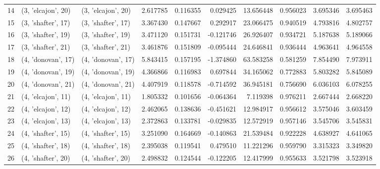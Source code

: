 \begin{tabular}{lllrrrrrrr}
14 &  (3, 'elcajon', 20) &  (3, 'elcajon', 20) &  2.617785 &  0.116355 &  0.029425 &  13.656448 &  0.956023 &  3.695346 &  3.695463 \\
15 &  (3, 'shafter', 17) &  (3, 'shafter', 17) &  3.367430 &  0.147667 &  0.292917 &  23.066475 &  0.940519 &  4.793816 &  4.802757 \\
16 &  (3, 'shafter', 19) &  (3, 'shafter', 19) &  3.471120 &  0.151731 & -0.121746 &  26.926407 &  0.934721 &  5.187638 &  5.189066 \\
17 &  (3, 'shafter', 21) &  (3, 'shafter', 21) &  3.461876 &  0.151809 & -0.095444 &  24.646841 &  0.936444 &  4.963641 &  4.964558 \\
18 &  (4, 'donovan', 17) &  (4, 'donovan', 17) &  5.843415 &  0.157195 & -1.374860 &  63.583258 &  0.581259 &  7.854490 &  7.973911 \\
19 &  (4, 'donovan', 19) &  (4, 'donovan', 19) &  4.366866 &  0.116983 &  0.697844 &  34.165062 &  0.772883 &  5.803282 &  5.845089 \\
20 &  (4, 'donovan', 21) &  (4, 'donovan', 21) &  4.407919 &  0.118578 & -0.714592 &  36.945181 &  0.756690 &  6.036103 &  6.078255 \\
21 &  (4, 'elcajon', 11) &  (4, 'elcajon', 11) &  1.805332 &  0.101656 & -0.064364 &   7.119398 &  0.976211 &  2.667444 &  2.668220 \\
22 &  (4, 'elcajon', 12) &  (4, 'elcajon', 12) &  2.462065 &  0.138636 & -0.451621 &  12.984917 &  0.956612 &  3.575046 &  3.603459 \\
23 &  (4, 'elcajon', 13) &  (4, 'elcajon', 13) &  2.372863 &  0.133781 & -0.029835 &  12.572919 &  0.957146 &  3.545706 &  3.545831 \\
24 &  (4, 'shafter', 15) &  (4, 'shafter', 15) &  3.251090 &  0.164669 & -0.140863 &  21.539484 &  0.922228 &  4.638927 &  4.641065 \\
25 &  (4, 'shafter', 18) &  (4, 'shafter', 18) &  2.395038 &  0.119541 &  0.479510 &  11.221296 &  0.959790 &  3.315323 &  3.349820 \\
26 &  (4, 'shafter', 20) &  (4, 'shafter', 20) &  2.498832 &  0.124544 & -0.122205 &  12.417999 &  0.955633 &  3.521798 &  3.523918 \\
\bottomrule
\end{tabular}
